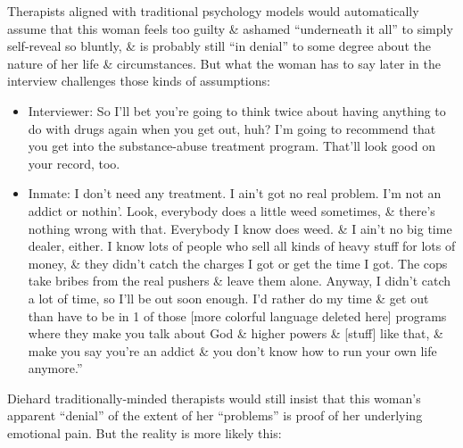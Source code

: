 \documentclass{article}
\numberwithin{equation}{section}
\begin{document}
Therapists aligned with traditional psychology models would automatically assume that this woman feels too guilty \& ashamed ``underneath it all'' to simply self-reveal so bluntly, \& is probably still ``in denial'' to some degree about the nature of her life \& circumstances. But what the woman has to say later in the interview challenges those kinds of assumptions:
\begin{itemize}
	\item Interviewer: So I'll bet you're going to think twice about having anything to do with drugs again when you get out, huh? I'm going to recommend that you get into the substance-abuse treatment program. That'll look good on your record, too.
	\item Inmate: I don't need any treatment. I ain't got no real problem. I'm not an addict or nothin'. Look, everybody does a little weed sometimes, \& there's nothing wrong with that. Everybody I know does weed. \& I ain't no big time dealer, either. I know lots of people who sell all kinds of heavy stuff for lots of money, \& they didn't catch the charges I got or get the time I got. The cops take bribes from the real pushers \& leave them alone. Anyway, I didn't catch a lot of time, so I'll be out soon enough. I'd rather do my time \& get out than have to be in 1 of those [more colorful language deleted here] programs where they make you talk about God \& higher powers \& [stuff] like that, \& make you say you're an addict \& you don't know how to run your own life anymore.''
\end{itemize}
Diehard traditionally-minded therapists would still insist that this woman's apparent ``denial'' of the extent of her ``problems'' is proof of her underlying emotional pain. But the reality is more likely this:
\end{document}
